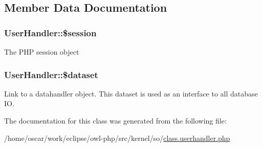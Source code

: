 \subsection{Member Data Documentation}
\hypertarget{classUserHandler_f097b7fd1ee085b46a6c34e071508a7f}{
\subsubsection{\setlength{\rightskip}{0pt plus 5cm}UserHandler::\$session}}
\label{classUserHandler_f097b7fd1ee085b46a6c34e071508a7f}


The PHP session object \hypertarget{classUserHandler_c38c1ea50b2820ed03781bdbe8eb2e08}{
\subsubsection{\setlength{\rightskip}{0pt plus 5cm}UserHandler::\$dataset}}
\label{classUserHandler_c38c1ea50b2820ed03781bdbe8eb2e08}


Link to a datahandler object. This dataset is used as an interface to all database IO. 

The documentation for this class was generated from the following file:\begin{CompactItemize}
\item 
/home/oscar/work/eclipse/owl-php/src/kernel/so/\hyperlink{class_8userhandler_8php}{class.userhandler.php}\end{CompactItemize}
